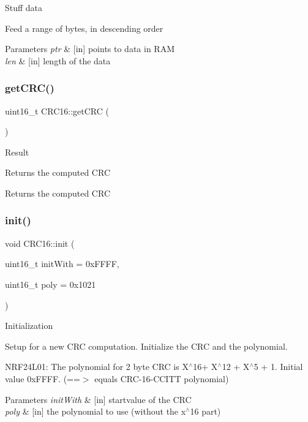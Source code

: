 Stuff data

Feed a range of bytes, in descending order 
\begin{DoxyParams}{Parameters}
{\em ptr} & \mbox{[}in\mbox{]} points to data in R\+AM \\
\hline
{\em len} & \mbox{[}in\mbox{]} length of the data \\
\hline
\end{DoxyParams}
\mbox{\label{class_c_r_c16_a5c2b7692080612c117bb1c8ceb57e3bc}} 
\subsubsection{\texorpdfstring{get\+C\+R\+C()}{getCRC()}}
{\footnotesize\ttfamily uint16\+\_\+t C\+R\+C16\+::get\+C\+RC (\begin{DoxyParamCaption}{ }\end{DoxyParamCaption})}

Result

Returns the computed C\+RC \begin{DoxyReturn}{Returns}
the computed C\+RC 
\end{DoxyReturn}
\mbox{\label{class_c_r_c16_a65bed8b421a029f5f78200b45657e86d}} 
\subsubsection{\texorpdfstring{init()}{init()}}
{\footnotesize\ttfamily void C\+R\+C16\+::init (\begin{DoxyParamCaption}\item[{uint16\+\_\+t}]{init\+With = {\ttfamily 0xFFFF},  }\item[{uint16\+\_\+t}]{poly = {\ttfamily 0x1021} }\end{DoxyParamCaption})}

Initialization

Setup for a new C\+RC computation. Initialize the C\+RC and the polynomial.

N\+R\+F24\+L01\+: The polynomial for 2 byte C\+RC is X$^\wedge$16+ X$^\wedge$12 + X$^\wedge$5 + 1. Initial value 0x\+F\+F\+FF. (==$>$ equals C\+R\+C-\/16-\/\+C\+C\+I\+TT polynomial) 
\begin{DoxyParams}{Parameters}
{\em init\+With} & \mbox{[}in\mbox{]} startvalue of the C\+RC \\
\hline
{\em poly} & \mbox{[}in\mbox{]} the polynomial to use (without the x$^\wedge$16 part) \\
\hline
\end{DoxyParams}


